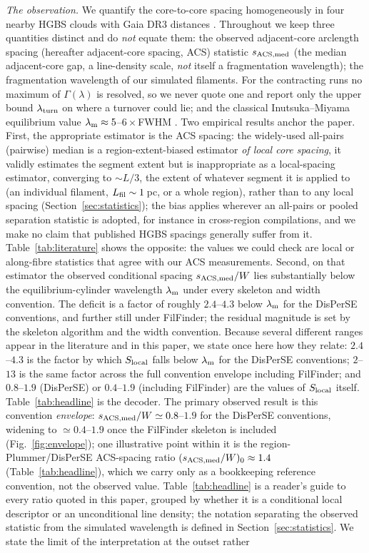 \documentclass[usenatbib,twoside,twocolumn]{mnras}
\begin{document}
\emph{The observation.} We quantify the core-to-core spacing homogeneously in four nearby HGBS clouds with Gaia DR3 distances \citep{Zhang2023}. Throughout we keep three quantities distinct and do \emph{not} equate them: the observed adjacent-core arclength spacing (hereafter adjacent-core spacing, ACS) statistic $s_{\rm ACS,med}$ (the median adjacent-core gap, a line-density scale, \emph{not} itself a fragmentation wavelength); the fragmentation wavelength of our simulated filaments. For the contracting runs no maximum of $\Gamma(\lambda)$ is resolved, so we never quote one and report only the upper bound $\lambda_{\rm turn}$ on where a turnover could lie; and the classical Inutsuka--Miyama equilibrium value $\lambda_{\rm m}\approx5$--$6\times$FWHM \citep{Inutsuka1992,Fischera2012}. Two empirical results anchor the paper. First, the appropriate estimator is the ACS spacing: the widely-used all-pairs (pairwise) median is a region-extent-biased estimator \emph{of local core spacing}, it validly estimates the segment extent but is inappropriate as a local-spacing estimator, converging to $\sim L/3$, the extent of whatever segment it is applied to (an individual filament, $L_{\rm fil}\sim1$\,pc, or a whole region), rather than to any local spacing (Section~\ref{sec:statistics}); the bias applies wherever an all-pairs or pooled separation statistic is adopted, for instance in cross-region compilations, and we make no claim that published HGBS spacings generally suffer from it. Table~\ref{tab:literature} shows the opposite: the values we could check are local or along-fibre statistics that agree with our ACS measurements. Second, on that estimator the observed conditional spacing $s_{\rm ACS,med}/W$ lies substantially below the equilibrium-cylinder wavelength $\lambda_{\rm m}$ under every skeleton and width convention. The deficit is a factor of roughly $2.4$--$4.3$ below $\lambda_{\rm m}$ for the DisPerSE conventions, and further still under FilFinder; the residual magnitude is set by the skeleton algorithm and the width convention. Because several different ranges appear in the literature and in this paper, we state once here how they relate: $2.4$--$4.3$ is the factor by which $S_{\rm local}$ falls below $\lambda_{\rm m}$ for the DisPerSE conventions; $2$--$13$ is the same factor across the full convention envelope including FilFinder; and $0.8$--$1.9$ (DisPerSE) or $0.4$--$1.9$ (including FilFinder) are the values of $S_{\rm local}$ itself. Table~\ref{tab:headline} is the decoder. The primary observed result is this convention \emph{envelope}: $s_{\rm ACS,med}/W\simeq0.8$--$1.9$ for the DisPerSE conventions, widening to $\simeq0.4$--$1.9$ once the FilFinder skeleton is included (Fig.~\ref{fig:envelope}); one illustrative point within it is the region-Plummer/DisPerSE ACS-spacing ratio $(s_{\rm ACS,med}/W)_0\approx1.4$ (Table~\ref{tab:headline}), which we carry only as a bookkeeping reference convention, not the observed value. Table~\ref{tab:headline} is a reader's guide to every ratio quoted in this paper, grouped by whether it is a conditional local descriptor or an unconditional line density; the notation separating the observed statistic from the simulated wavelength is defined in Section~\ref{sec:statistics}. We state the limit of the interpretation at the outset rather 
\end{document}
